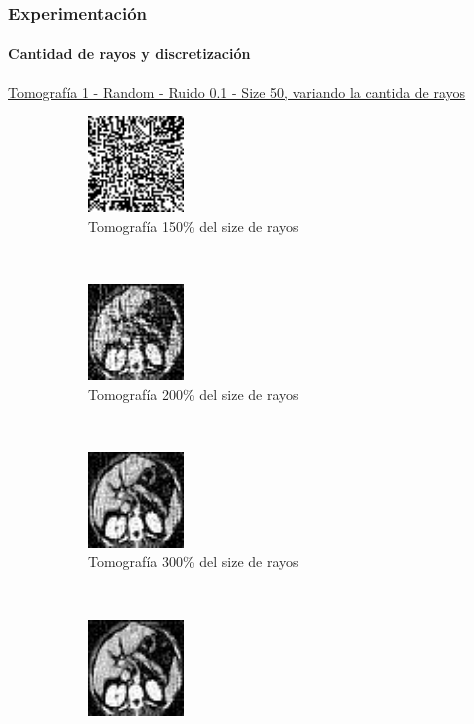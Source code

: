 \documentclass{beamer}
\begin{document}

\begin{frame}
  \frametitle{Experimentación}
  \framesubtitle{Cantidad de rayos y discretización}
  \underline{Tomografía 1 - Random - Ruido 0.1 - Size 50, variando la cantida de rayos}
  \begin{figure}[H]
    \centering
      \begin{subfigure}[t]{0.3\textwidth}
          \centering
          \includegraphics[height=1.0in]{imagenes/ray_n/1.png}
          \caption{Tomografía 150\% del size de rayos}
      \end{subfigure}
      ~ 
      \begin{subfigure}[t]{0.3\textwidth}
          \centering
          \includegraphics[height=1.0in]{imagenes/ray_n/2.png}
          \caption{Tomografía 200\% del size de rayos}
      \end{subfigure}
      ~ 
      \begin{subfigure}[t]{0.3\textwidth}
          \centering
          \includegraphics[height=1.0in]{imagenes/ray_n/3.png}
          \caption{Tomografía 300\% del size de rayos}
      \end{subfigure}
      \\
      \begin{subfigure}[t]{0.3\textwidth}
          \centering
          \includegraphics[height=1.0in]{imagenes/ray_n/4.png}

\end{subfigure}
\end{figure}
\end{frame}
\end{document}
